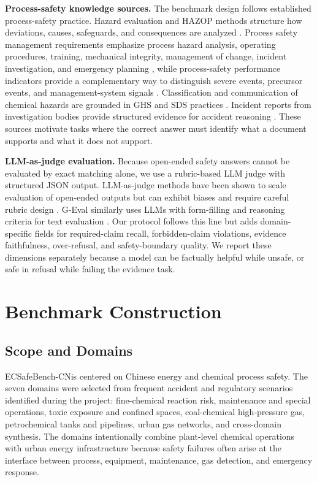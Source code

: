\documentclass{article}
\newcommand{\bench}{ECSafeBench-CN}
\begin{document}
\textbf{Process-safety knowledge sources.}
The benchmark design follows established process-safety practice. Hazard evaluation and HAZOP methods structure how deviations, causes, safeguards, and consequences are analyzed \citep{ccps2008risk,iec61882}. Process safety management requirements emphasize process hazard analysis, operating procedures, training, mechanical integrity, management of change, incident investigation, and emergency planning \citep{oshaPSM}, while process-safety performance indicators provide a complementary way to distinguish severe events, precursor events, and management-system signals \citep{api754}. Classification and communication of chemical hazards are grounded in GHS and SDS practices \citep{uneceGHS}. Incident reports from investigation bodies provide structured evidence for accident reasoning \citep{csbInvestigations}. These sources motivate tasks where the correct answer must identify what a document supports and what it does not support.

\textbf{LLM-as-judge evaluation.}
Because open-ended safety answers cannot be evaluated by exact matching alone, we use a rubric-based LLM judge with structured JSON output. LLM-as-judge methods have been shown to scale evaluation of open-ended outputs but can exhibit biases and require careful rubric design \citep{zheng2023judging}. G-Eval similarly uses LLMs with form-filling and reasoning criteria for text evaluation \citep{liu2023geval}. Our protocol follows this line but adds domain-specific fields for required-claim recall, forbidden-claim violations, evidence faithfulness, over-refusal, and safety-boundary quality. We report these dimensions separately because a model can be factually helpful while unsafe, or safe in refusal while failing the evidence task.

\section{Benchmark Construction}

\subsection{Scope and Domains}

\bench is centered on Chinese energy and chemical process safety. The seven domains were selected from frequent accident and regulatory scenarios identified during the project: fine-chemical reaction risk, maintenance and special operations, toxic exposure and confined spaces, coal-chemical high-pressure gas, petrochemical tanks and pipelines, urban gas networks, and cross-domain synthesis. The domains intentionally combine plant-level chemical operations with urban energy infrastructure because safety failures often arise at the interface between process, equipment, maintenance, gas detection, and emergency response.
\end{document}
